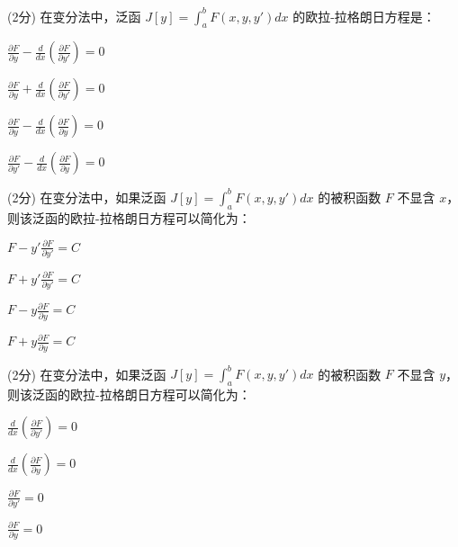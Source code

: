 \documentclass{njustexam}
\begin{document}
                    \begin{problem}{(2分)}
                    在变分法中，泛函 $J[y] = \int_{a}^{b} F(x, y, y') dx$ 的欧拉-拉格朗日方程是：
                    \begin{abcd}
                    \item $\frac{\partial F}{\partial y} - \frac{d}{dx} \left( \frac{\partial F}{\partial y'} \right) = 0$
                    \item $\frac{\partial F}{\partial y} + \frac{d}{dx} \left( \frac{\partial F}{\partial y'} \right) = 0$
                    \item $\frac{\partial F}{\partial y} - \frac{d}{dx} \left( \frac{\partial F}{\partial y} \right) = 0$
                    \item $\frac{\partial F}{\partial y'} - \frac{d}{dx} \left( \frac{\partial F}{\partial y} \right) = 0$
                    \end{abcd}
                    \end{problem}
                    
                    \begin{problem}{(2分)}
                    在变分法中，如果泛函 $J[y] = \int_{a}^{b} F(x, y, y') dx$ 的被积函数 $F$ 不显含 $x$，则该泛函的欧拉-拉格朗日方程可以简化为：
                    \begin{abcd}
                    \item $F - y' \frac{\partial F}{\partial y'} = C$
                    \item $F + y' \frac{\partial F}{\partial y'} = C$
                    \item $F - y \frac{\partial F}{\partial y} = C$
                    \item $F + y \frac{\partial F}{\partial y} = C$
                    \end{abcd}
                    \end{problem}
                    
                    \begin{problem}{(2分)}
                    在变分法中，如果泛函 $J[y] = \int_{a}^{b} F(x, y, y') dx$ 的被积函数 $F$ 不显含 $y$，则该泛函的欧拉-拉格朗日方程可以简化为：
                    \begin{abcd}
                    \item $\frac{d}{dx} \left( \frac{\partial F}{\partial y'} \right) = 0$
                    \item $\frac{d}{dx} \left( \frac{\partial F}{\partial y} \right) = 0$
                    \item $\frac{\partial F}{\partial y'} = 0$
                    \item $\frac{\partial F}{\partial y} = 0$
                    \end{abcd}
                    \end{problem}
                    
\end{document}
